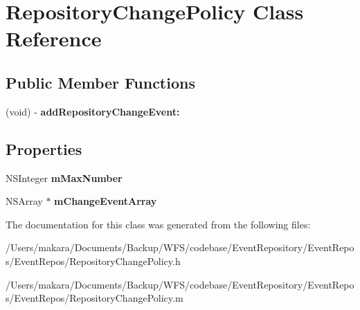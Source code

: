\hypertarget{interface_repository_change_policy}{
\section{\-Repository\-Change\-Policy \-Class \-Reference}
\label{interface_repository_change_policy}
}
\subsection*{\-Public \-Member \-Functions}
\begin{DoxyCompactItemize}
\item 
\hypertarget{interface_repository_change_policy_a740adfb188b90c2841d15db1b08bda23}{
(void) -\/ {\bfseries add\-Repository\-Change\-Event\-:}}
\label{interface_repository_change_policy_a740adfb188b90c2841d15db1b08bda23}

\end{DoxyCompactItemize}
\subsection*{\-Properties}
\begin{DoxyCompactItemize}
\item 
\hypertarget{interface_repository_change_policy_a5e84a0c6ca3723d4c9e8032a51ebae86}{
\-N\-S\-Integer {\bfseries m\-Max\-Number}}
\label{interface_repository_change_policy_a5e84a0c6ca3723d4c9e8032a51ebae86}

\item 
\hypertarget{interface_repository_change_policy_a3cde9848e370eac0f4a0517a4c1537a8}{
\-N\-S\-Array $\ast$ {\bfseries m\-Change\-Event\-Array}}
\label{interface_repository_change_policy_a3cde9848e370eac0f4a0517a4c1537a8}

\end{DoxyCompactItemize}


\-The documentation for this class was generated from the following files\-:\begin{DoxyCompactItemize}
\item 
/\-Users/makara/\-Documents/\-Backup/\-W\-F\-S/codebase/\-Event\-Repository/\-Event\-Repos/\-Event\-Repos/\-Repository\-Change\-Policy.\-h\item 
/\-Users/makara/\-Documents/\-Backup/\-W\-F\-S/codebase/\-Event\-Repository/\-Event\-Repos/\-Event\-Repos/\-Repository\-Change\-Policy.\-m\end{DoxyCompactItemize}
